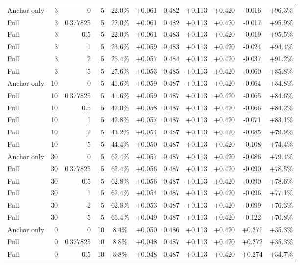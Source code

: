 \begin{table}[htbp]
\begin{tabular}{lrrrccccccc}
Anchor only & 3 & 0 & 5 & 22.0\% & +0.061 & 0.482 & +0.113 & +0.420 & -0.016 & +96.3\% \\
Full & 3 & 0.377825 & 5 & 22.0\% & +0.061 & 0.482 & +0.113 & +0.420 & -0.017 & +95.9\% \\
Full & 3 & 0.5 & 5 & 22.0\% & +0.061 & 0.483 & +0.113 & +0.420 & -0.019 & +95.5\% \\
Full & 3 & 1 & 5 & 23.6\% & +0.059 & 0.483 & +0.113 & +0.420 & -0.024 & +94.4\% \\
Full & 3 & 2 & 5 & 26.4\% & +0.057 & 0.484 & +0.113 & +0.420 & -0.037 & +91.2\% \\
Full & 3 & 5 & 5 & 27.6\% & +0.053 & 0.485 & +0.113 & +0.420 & -0.060 & +85.8\% \\
Anchor only & 10 & 0 & 5 & 41.6\% & +0.059 & 0.487 & +0.113 & +0.420 & -0.064 & +84.8\% \\
Full & 10 & 0.377825 & 5 & 41.6\% & +0.059 & 0.487 & +0.113 & +0.420 & -0.065 & +84.6\% \\
Full & 10 & 0.5 & 5 & 42.0\% & +0.058 & 0.487 & +0.113 & +0.420 & -0.066 & +84.2\% \\
Full & 10 & 1 & 5 & 42.8\% & +0.057 & 0.487 & +0.113 & +0.420 & -0.071 & +83.1\% \\
Full & 10 & 2 & 5 & 43.2\% & +0.054 & 0.487 & +0.113 & +0.420 & -0.085 & +79.9\% \\
Full & 10 & 5 & 5 & 44.4\% & +0.050 & 0.487 & +0.113 & +0.420 & -0.108 & +74.4\% \\
Anchor only & 30 & 0 & 5 & 62.4\% & +0.057 & 0.487 & +0.113 & +0.420 & -0.086 & +79.4\% \\
Full & 30 & 0.377825 & 5 & 62.4\% & +0.056 & 0.487 & +0.113 & +0.420 & -0.090 & +78.5\% \\
Full & 30 & 0.5 & 5 & 62.8\% & +0.056 & 0.487 & +0.113 & +0.420 & -0.090 & +78.6\% \\
Full & 30 & 1 & 5 & 62.4\% & +0.054 & 0.487 & +0.113 & +0.420 & -0.096 & +77.1\% \\
Full & 30 & 2 & 5 & 62.8\% & +0.053 & 0.487 & +0.113 & +0.420 & -0.099 & +76.3\% \\
Full & 30 & 5 & 5 & 66.4\% & +0.049 & 0.487 & +0.113 & +0.420 & -0.122 & +70.8\% \\
Anchor only & 0 & 0 & 10 & 8.4\% & +0.050 & 0.486 & +0.113 & +0.420 & +0.271 & +35.3\% \\
Full & 0 & 0.377825 & 10 & 8.8\% & +0.048 & 0.487 & +0.113 & +0.420 & +0.272 & +35.3\% \\
Full & 0 & 0.5 & 10 & 8.8\% & +0.048 & 0.487 & +0.113 & +0.420 & +0.274 & +34.7\% \\

\end{tabular}
\end{table}

